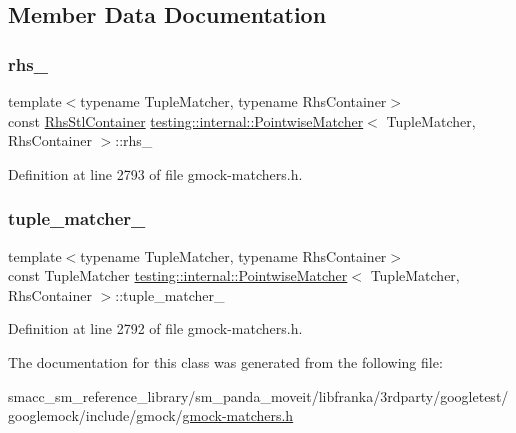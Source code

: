 \subsection{Member Data Documentation}
\mbox{\label{classtesting_1_1internal_1_1PointwiseMatcher_a99dc64b7cd3d5f78742d8a3ed2c4793c}} 
\subsubsection{\texorpdfstring{rhs\+\_\+}{rhs\_}}
{\footnotesize\ttfamily template$<$typename Tuple\+Matcher, typename Rhs\+Container$>$ \\
const \hyperlink{classtesting_1_1internal_1_1PointwiseMatcher_aadbaec8c93351f29b103816c2e397edd}{Rhs\+Stl\+Container} \hyperlink{classtesting_1_1internal_1_1PointwiseMatcher}{testing\+::internal\+::\+Pointwise\+Matcher}$<$ Tuple\+Matcher, Rhs\+Container $>$\+::rhs\+\_\+\hspace{0.3cm}{\ttfamily [private]}}



Definition at line 2793 of file gmock-\/matchers.\+h.

\mbox{\label{classtesting_1_1internal_1_1PointwiseMatcher_a88ff006de49679fa44b438bfa1f6d153}} 
\subsubsection{\texorpdfstring{tuple\+\_\+matcher\+\_\+}{tuple\_matcher\_}}
{\footnotesize\ttfamily template$<$typename Tuple\+Matcher, typename Rhs\+Container$>$ \\
const Tuple\+Matcher \hyperlink{classtesting_1_1internal_1_1PointwiseMatcher}{testing\+::internal\+::\+Pointwise\+Matcher}$<$ Tuple\+Matcher, Rhs\+Container $>$\+::tuple\+\_\+matcher\+\_\+\hspace{0.3cm}{\ttfamily [private]}}



Definition at line 2792 of file gmock-\/matchers.\+h.



The documentation for this class was generated from the following file\+:\begin{DoxyCompactItemize}
\item 
smacc\+\_\+sm\+\_\+reference\+\_\+library/sm\+\_\+panda\+\_\+moveit/libfranka/3rdparty/googletest/googlemock/include/gmock/\hyperlink{gmock-matchers_8h}{gmock-\/matchers.\+h}\end{DoxyCompactItemize}
